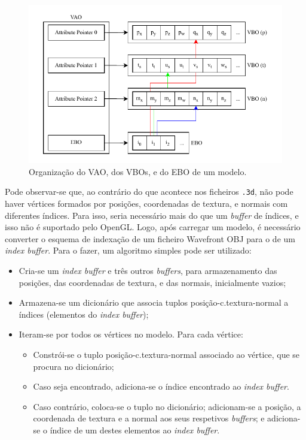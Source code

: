 \documentclass[12pt, a4paper]{article}
\begin{document}
\begin{figure}[H]
    \centering
    \includegraphics[width=\textwidth]{res/phase4/VAO.pdf}
    \caption{Organização do VAO, dos VBOs, e do EBO de um modelo.}
\end{figure}

Pode observar-se que, ao contrário do que acontece nos ficheiros \texttt{.3d}, não pode haver
vértices formados por posições, coordenadas de textura, e normais com diferentes índices. Para isso,
seria necessário mais do que um \emph{buffer} de índices, e isso não é suportado pelo OpenGL. Logo,
após carregar um modelo, é necessário converter o esquema de indexação de um ficheiro Wavefront OBJ
para o de um \emph{index buffer}. Para o fazer, um algoritmo simples pode ser utilizado:

\begin{itemize}
    \item Cria-se um \emph{index buffer} e três outros \emph{buffers}, para armazenamento das
        posições, das coordenadas de textura, e das normais, inicialmente vazios;

    \item Armazena-se um dicionário que associa tuplos posição-c.textura-normal a índices (elementos
        do \emph{index buffer});

    \item Iteram-se por todos os vértices no modelo. Para cada vértice:
        \begin{itemize}
            \item Constrói-se o tuplo posição-c.textura-normal associado ao vértice, que se procura
                no dicionário;
            \item Caso seja encontrado, adiciona-se o índice encontrado ao \emph{index buffer}.
            \item Caso contrário, coloca-se o tuplo no dicionário; adicionam-se a posição, a
                coordenada de textura e a normal aos seus respetivos \emph{buffers}; e adiciona-se o
                índice de um destes elementos ao \emph{index buffer}.
        \end{itemize}
\end{itemize}
\end{document}
